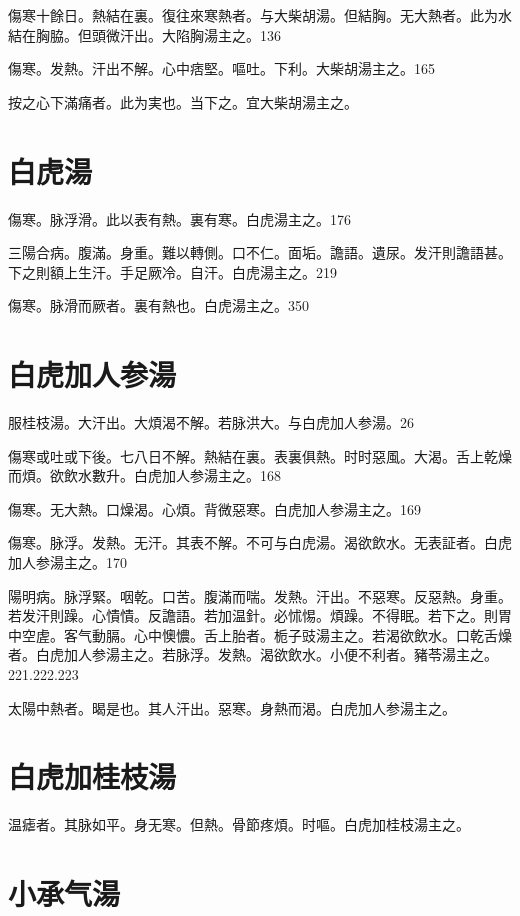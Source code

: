 \documentclass[b5paper,twoside,zihao=-4,UTF8]{ctexbook}
\begin{document}
傷寒十餘日。熱結在裏。復往來寒熱者。与大柴胡湯。但結胸。无大熱者。此为水結在胸脇。{但}頭微汗出。大陷胸湯主之。136

傷寒。发熱。汗出不解。心中痞堅。嘔吐。下利。大柴胡湯主之。165

按之心下滿痛者。此为実也。当下之。宜大柴胡湯主之。

\section{白虎湯}

傷寒。脉浮滑。此以表有熱。裏有寒。白虎湯主之。176

三陽合病。腹滿。身重。難以轉側。口不仁。面垢。譫語。遺尿。发汗則譫語{甚}。下之則額上生汗。手足厥冷。自汗。白虎湯主之。219

傷寒。脉滑而厥者。裏有熱也。白虎湯主之。350

\section{白虎加人参湯}

服桂枝湯。大汗出。大煩渴不解。若脉洪大。与白虎{加人参}湯。26

傷寒或吐或下後。七八日不解。熱結在裏。表裏俱熱。时时惡風。大渴。舌上乾燥而煩。欲飲水數升。白虎{加人参}湯主之。168

傷寒。无大熱。口燥渴。心煩。背微惡寒。白虎{加人参}湯主之。169

傷寒。脉浮。发熱。无汗。其表不解。不可与白虎湯。渴欲飲水。无表証者。白虎{加人参}湯主之。170

陽明病。脉浮緊。咽乾。口苦。腹滿而喘。发熱。汗出。不惡寒。反惡熱。身重。若发汗則躁。心憒憒。反譫語。若加温針。必怵惕。煩躁。不得眠。若下之。則胃中空虗。客气動膈。心中懊憹。舌上胎者。栀子{豉}湯主之。若渴欲飲水。口乾舌燥者。白虎{加人参}湯主之。若脉浮。发熱。渴欲飲水。小便不利者。豬苓湯主之。221.222.223

太陽中熱者。暍是也。其人汗出。惡寒。身熱而渴。白虎{加人参}湯主之。

\section{白虎加桂枝湯}

温瘧者。其脉如平。身无寒。但熱。骨節疼煩。时嘔。白虎加桂枝湯主之。

\section{小承气湯}
\end{document}

